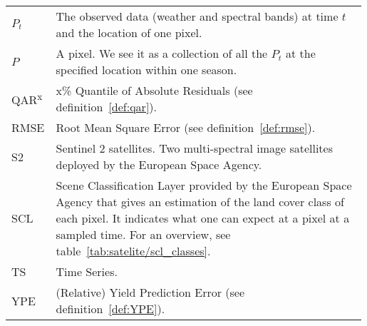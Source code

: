 \begin{longtable}{p{0.12\linewidth} p{0.87\linewidth}}
	$P_t$       & The observed data (weather and spectral bands) at time $t$ and the location of one pixel.\\
	$P$       & A pixel. We see it as a collection of all the $P_t$ at the specified location within one season. \\
    QAR\textsuperscript{x}       & x\% Quantile of Absolute Residuals  (see definition~\ref{def:qar}).\\
	RMSE         & Root Mean Square Error (see definition~\ref{def:rmse}).\\
	S2       & Sentinel 2 satellites. Two multi-spectral image satellites deployed by the European Space Agency.\\
	SCL       & Scene Classification Layer provided by the European Space Agency that gives an estimation of the land cover class of each pixel. It indicates what one can expect at a pixel at a sampled time. For an overview, see table~\ref{tab:satelite/scl_classes}.\\
	TS       & Time Series.\\
	YPE        & (Relative) Yield Prediction Error (see definition~\ref{def:YPE}).\\
\end{longtable} 

